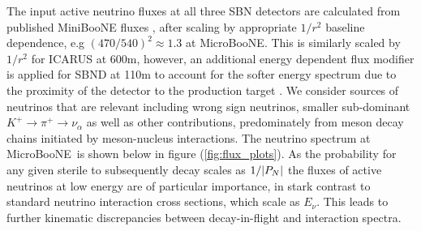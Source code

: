 \documentclass[11pt, a4paper]{article}
\def\muboone{MicroBooNE}
\def\ster{\ensuremath N}
\begin{document}
The input active neutrino fluxes at all three SBN detectors are calculated from published
MiniBooNE fluxes \cite{AguilarArevalo:2008yp}, after scaling by appropriate
$1/r^2$ baseline dependence, e.g $(470/540)^2 \approx 1.3$ at \muboone. This
is similarly scaled by $1/r^2$ for ICARUS at 600m, however, an additional
energy dependent flux modifier is applied for SBND at 110m to account for the
softer energy spectrum due to the proximity of the detector to the production
target \cite{Antonello:2015lea}. We consider sources of neutrinos that are
relevant including wrong sign neutrinos, smaller sub-dominant $K^+\rightarrow
\pi^+\rightarrow \nu_\alpha$ as well as other contributions, predominately from
meson decay chains initiated by meson-nucleus interactions. The neutrino spectrum at \muboone\ is shown below in figure
(\ref{fig:flux_plots}). As the probability for any given sterile to subsequently decay scales as
$1/|P_{\ster}|$ the fluxes of active neutrinos at low energy are of particular importance, in stark contrast to standard neutrino interaction cross sections, which scale as $E_\nu$. This leads to further kinematic discrepancies between decay-in-flight and interaction spectra. 
\end{document}
